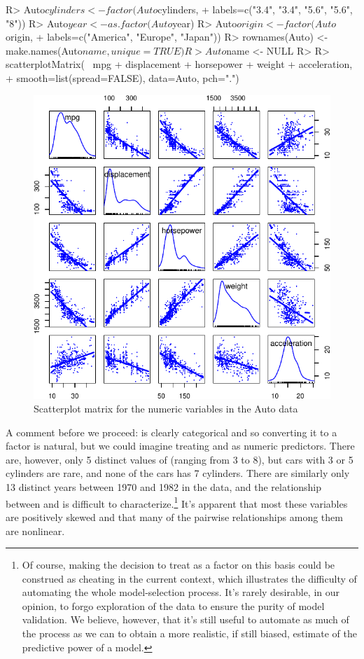 \documentclass[
]{jss}
\begin{document}
\begin{CodeChunk}
\begin{CodeInput}
R> Auto$cylinders <- factor(Auto$cylinders,
+                          labels=c("3.4", "3.4", "5.6", "5.6", "8"))
R> Auto$year <- as.factor(Auto$year)
R> Auto$origin <- factor(Auto$origin,
+                       labels=c("America", "Europe", "Japan"))
R> rownames(Auto) <- make.names(Auto$name, unique=TRUE)
R> Auto$name <- NULL
R> 
R> scatterplotMatrix(~ mpg + displacement + horsepower + weight + acceleration, 
+                   smooth=list(spread=FALSE), data=Auto, pch=".")
\end{CodeInput}
\begin{figure}

{\centering \includegraphics[width=0.6\linewidth]{JSS-article-reduced_files/figure-latex/Auto-explore-1} 

}

\caption[Scatterplot matrix for the numeric variables in the Auto data]{Scatterplot matrix for the numeric variables in the Auto data}\label{fig:Auto-explore}
\end{figure}
\end{CodeChunk}

A comment before we proceed:  is clearly categorical and so
converting it to a factor is natural, but we could imagine treating
 and  as numeric predictors. There are,
however, only 5 distinct values of  (ranging from 3 to
8), but cars with 3 or 5 cylinders are rare, and none of the cars has 7
cylinders. There are similarly only 13 distinct years between 1970 and
1982 in the data, and the relationship between  and
 is difficult to characterize.\footnote{Of course, making the
  decision to treat  as a factor on this basis could be
  construed as cheating in the current context, which illustrates the
  difficulty of automating the whole model-selection process. It's
  rarely desirable, in our opinion, to forgo exploration of the data to
  ensure the purity of model validation. We believe, however, that it's
  still useful to automate as much of the process as we can to obtain a
  more realistic, if still biased, estimate of the predictive power of a
  model.} It's apparent that most these variables are positively skewed
and that many of the pairwise relationships among them are nonlinear.
\end{document}
